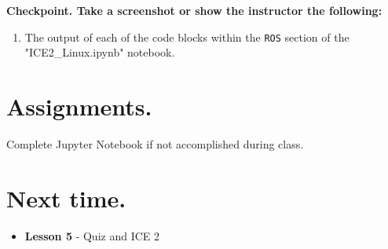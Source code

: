 \documentclass{handout}
\begin{document}
\textbf{Checkpoint. Take a screenshot or show the instructor the following:}
\begin{enumerate}
	\item The output of each of the code blocks within the \texttt{ROS} section of the "ICE2\_Linux.ipynb" notebook.
\end{enumerate}

\newpage
\clearpage
\pagebreak

\section{Assignments.}
	\begin{todolist}
		\item Complete Jupyter Notebook if not accomplished during class.
	\end{todolist}

\section{Next time.}
	\begin{itemize}
		\item \textbf{Lesson 5} - Quiz and ICE 2
	\end{itemize}
\end{document}
